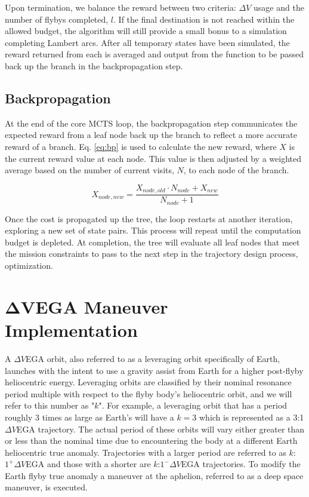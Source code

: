 \documentclass[letterpaper, paper,11pt]{AAS}	%
\begin{document}
Upon termination, we balance the reward between two criteria: $\Delta V$ usage and the number of flybys completed, $l$. If the final destination is not reached within the allowed budget, the algorithm will still provide a small bonus to a simulation completing Lambert arcs. After all temporary states have been simulated, the reward returned from each is averaged and output from the function to be passed back up the branch in the backpropagation step.

\subsection{Backpropagation}

At the end of the core MCTS loop, the backpropagation step communicates the expected reward from a leaf node back up the branch to reflect a more accurate reward of a branch. Eq. \eqref{eq:bp} is used to calculate the new reward, where $X$ is the current reward value at each node. This value is then adjusted by a weighted average based on the number of current visits, $N$, to each node of the branch.

\begin{equation}
    \label{eq:bp}
    X_{node, new} = \frac{X_{node, old} \cdot N_{node} + X_{new}}{N_{node} + 1}
\end{equation}

Once the cost is propagated up the tree, the loop restarts at another iteration, exploring a new set of state pairs. This process will repeat until the computation budget is depleted. At completion, the tree will evaluate all leaf nodes that meet the mission constraints to pass to the next step in the trajectory design process, optimization.

\section*{$\boldsymbol{\Delta V}$EGA Maneuver Implementation}

A $\Delta V$EGA orbit, also referred to as a leveraging orbit specifically of Earth, launches with the intent to use a gravity assist from Earth for a higher post-flyby heliocentric energy\cite{Hollenbeck}. Leveraging orbits are classified by their nominal resonance period multiple with respect to the flyby body's heliocentric orbit, and we will refer to this number as "$k$". For example, a leveraging orbit that has a period roughly 3 times as large as Earth's will have a $k=3$ which is represented as a 3:1 $\Delta V$EGA trajectory. The actual period of these orbits will vary either greater than or less than the nominal time due to encountering the body at a different Earth heliocentric true anomaly. Trajectories with a larger period are referred to as $k$:$1^{+} \Delta V$EGA and those with a shorter are $k$:$1^{-} \Delta V$EGA trajectories. To modify the Earth flyby true anomaly a maneuver at the aphelion, referred to as a deep space maneuver, is executed.
\end{document}
